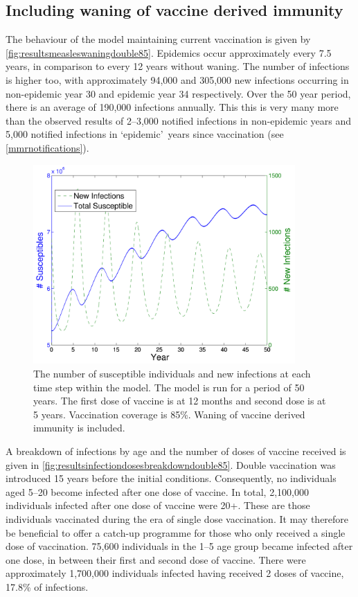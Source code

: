 \documentclass[a4paper,11pt] {scrartcl}
\begin{document}
\newpage
\subsection{Including waning of vaccine derived immunity}
\label{subsec:resultswaning}
The behaviour of the model maintaining current vaccination is given by \autoref{fig:resultsmeasleswaningdouble85}. Epidemics occur approximately every 7.5 years, in comparison to every 12 years without waning. The number of infections is higher too, with approximately 94,000 and 305,000 new infections occurring in non-epidemic year 30 and epidemic year 34 respectively. Over the 50 year period, there is an average of 190,000 infections annually. This this is very many more than the observed results of 2--3,000 notified infections in non-epidemic years and 5,000 notified infections in `epidemic'\ years since vaccination (see \autoref{mmrnotifications}).

\begin{figure}[h]
	\centering
	\includegraphics[width=100mm]{measleswaningdouble85}
	\caption{The number of susceptible individuals and new infections at each time step within the model. The model is run for a period of 50 years. The first dose of vaccine is at 12 months and second dose is at 5 years. Vaccination coverage is 85\%. Waning of vaccine derived immunity is included.}
	\label{fig:resultsmeasleswaningdouble85}
\end{figure}

A breakdown of infections by age and the number of doses of vaccine received is given in \autoref{fig:resultsinfectiondosesbreakdowndouble85}. Double vaccination was introduced 15 years before the initial conditions. Consequently, no individuals aged 5--20 become infected after one dose of vaccine. In total, 2,100,000 individuals infected after one dose of vaccine were 20+. These are those individuals vaccinated during the era of single dose vaccination. It may therefore be beneficial to offer a catch-up programme for those who only received a single dose of vaccination. 75,600 individuals in the 1--5 age group became infected after one dose, in between their first and second dose of vaccine. There were approximately 1,700,000 individuals infected having received 2 doses of vaccine, 17.8\% of infections.
\end{document}
